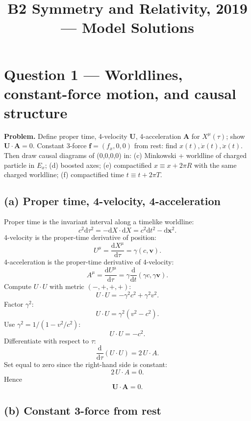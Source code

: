 \documentclass[11pt]{article}
\title{B2 Symmetry and Relativity, 2019 --- Model Solutions}
\author{}
\date{}
\newcommand{\de}{\mathrm{d}}
\begin{document}
\maketitle

\section*{Question 1 --- Worldlines, constant-force motion, and causal structure}

\textbf{Problem.} Define proper time, 4-velocity $\bm U$, 4-acceleration $\bm A$ for $X^\mu(\tau)$; show $\bm U\cdot\bm A=0$. Constant 3-force $\bm f=(f_x,0,0)$ from rest: find $x(t),\dot x(t),\ddot x(t)$. Then draw causal diagrams of (0,0,0,0) in: (c) Minkowski + worldline of charged particle in $E_x$; (d) boosted axes; (e) compactified $x\equiv x+2\pi R$ with the same charged worldline; (f) compactified time $t\equiv t+2\pi T$.

\subsection*{(a) Proper time, 4-velocity, 4-acceleration}

Proper time is the invariant interval along a timelike worldline:
\[ c^2\de\tau^2 = -\de X\cdot\de X = c^2\de t^2 - \de\bm x^2. \]
4-velocity is the proper-time derivative of position:
\[ U^\mu = \frac{\de X^\mu}{\de\tau} = \gamma(c,\bm v). \]
4-acceleration is the proper-time derivative of 4-velocity:
\[ A^\mu = \frac{\de U^\mu}{\de\tau} = \gamma\frac{\de}{\de t}(\gamma c,\gamma\bm v). \]
Compute $U\cdot U$ with metric $(-,+,+,+)$:
\[ U\cdot U = -\gamma^2 c^2 + \gamma^2 v^2. \]
Factor $\gamma^2$:
\[ U\cdot U = \gamma^2(v^2 - c^2). \]
Use $\gamma^2 = 1/(1-v^2/c^2)$:
\[ U\cdot U = -c^2. \]
Differentiate with respect to $\tau$:
\[ \frac{\de}{\de\tau}(U\cdot U) = 2\,U\cdot A. \]
Set equal to zero since the right-hand side is constant:
\[ 2\,U\cdot A = 0. \]
Hence
\begin{equation}
\boxed{\bm U\cdot\bm A = 0.}
\end{equation}

\subsection*{(b) Constant 3-force from rest}
\end{document}
